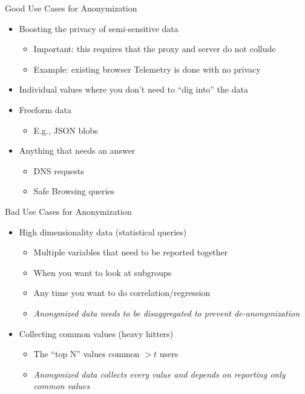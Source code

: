 \documentclass[helvetica]{beamer}
\begin{document}
\begin{frame}{Good Use Cases for Anonymization}

  \begin{itemize}
  \item Boosting the privacy of semi-sensitive data
    \begin{itemize}
    \item Important: this requires that the proxy and server do not collude      
    \item Example: existing browser Telemetry is done with no privacy
    \end{itemize}

  \item Individual values where you don't need to ``dig into'' the data
    
  \item Freeform data
    \begin{itemize}
    \item E.g., JSON blobs
    \end{itemize}

  \item Anything that needs an answer
    \begin{itemize}
    \item DNS requests
    \item Safe Browsing queries
    \end{itemize}
  \end{itemize}
\end{frame}


\begin{frame}{Bad Use Cases for Anonymization}

  \begin{itemize}
  \item High dimensionality data (statistical queries)
    \begin{itemize}
    \item Multiple variables that need to be reported together
    \item When you want to look at subgroups
    \item Any time you want to do correlation/regression
    \item \emph{Anonymized data needs to be disaggregated to prevent de-anonymization}
    \end{itemize}

  \item Collecting common values (heavy hitters)
    \begin{itemize}
    \item The ``top N'' values common $>t$ users
    \item \emph{Anonymized data collects every value and depends on reporting only common values}      
    \end{itemize}
  \end{itemize}
\end{frame}
\end{document}
